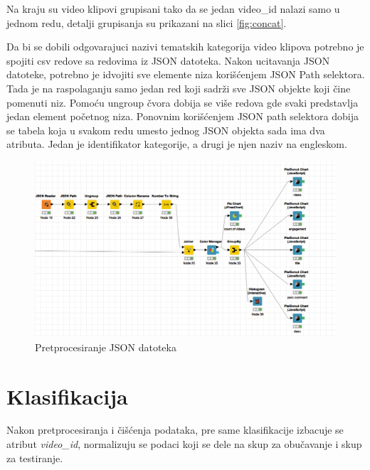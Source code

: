 \documentclass[a4paper]{article}
\theoremstyle{definition}
\begin{document}
Na kraju su video klipovi grupisani tako da se jedan video\_id nalazi samo u jednom redu, detalji grupisanja su prikazani na slici \ref{fig:concat}.

Da bi se dobili odgovarajuci nazivi tematskih kategorija video klipova potrebno je spojiti csv redove sa redovima iz JSON datoteka.
Nakon ucitavanja JSON datoteke, potrebno je idvojiti sve elemente niza korišćenjem JSON Path selektora.
Tada je na raspolaganju samo jedan red koji sadrži sve JSON objekte koji čine pomenuti niz.
Pomoću ungroup čvora dobija se više redova gde svaki predstavlja jedan element početnog niza.
Ponovnim korišćenjem JSON path selektora dobija se tabela koja u svakom redu umesto jednog JSON objekta
sada ima dva atributa. Jedan je identifikator kategorije, a drugi je njen naziv na engleskom.
\begin{figure}[H]
\begin{center}
    \includegraphics[width=1\textwidth]{json_of_categories.png}
    \caption{Pretprocesiranje JSON datoteka}
    \label{fig:json}
\end{center}
\end{figure}


\section{Klasifikacija}
\label{sec:klasifikacija}
Nakon pretprocesiranja i čišćenja podataka, pre same klasifikacije izbacuje se atribut \textit{video\_id}, normalizuju se podaci koji se dele na skup za obučavanje i skup za testiranje.
\end{document}
